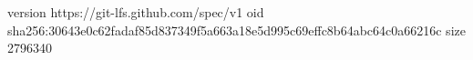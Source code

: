 version https://git-lfs.github.com/spec/v1
oid sha256:30643e0c62fadaf85d837349f5a663a18e5d995c69effc8b64abc64c0a66216c
size 2796340
